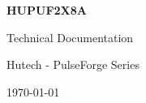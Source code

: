 \begin{titlepage}
    \vspace*{\fill}
    \begin{center}
        {\Huge \textbf{HUPUF2X8A}}
        
        \vspace{1cm}
        
        {\Large Technical Documentation}
        
        \vspace{2cm}
        
        {\large Hutech - PulseForge Series}
        
        \vspace{0.5cm}
        
        {\large \today}
    \end{center}
    \vspace*{\fill}
\end{titlepage}
\newpage
